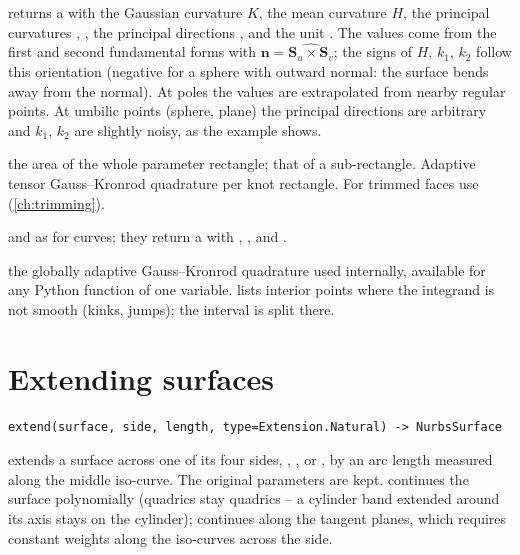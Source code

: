 \begin{description}[style=nextline]
\item[\apiref{surface_curvature}\code{(surface, u, v)}] returns a  with
  the Gaussian curvature  $K$, the mean curvature  $H$, the principal
  curvatures , , the principal directions ,  and the unit
  . The values come from the first and second fundamental forms with $\mathbf n =
  \widehat{\mathbf S_u\times\mathbf S_v}$; the signs of $H$, $k_1$, $k_2$ follow this
  orientation (negative for a sphere with outward normal: the surface bends away from the
  normal). At poles the values are extrapolated from nearby regular points. At umbilic points
  (sphere, plane) the principal directions are arbitrary and $k_1$, $k_2$ are slightly noisy,
  as the example shows.
\item[\apiref{area}\code{(surface, rel_tol=1e-10)}] the area of the whole parameter rectangle;
   that of a sub-rectangle. Adaptive tensor
  Gauss--Kronrod quadrature per knot rectangle. For trimmed faces use
   (\cref{ch:trimming}).
\item[\apiref{closest_point}\code{(surface, point)}] and
   as for curves; they return a
   with , ,  and .
\item[\apiref{integrate}\code{(f, a, b, rel_tol=1e-10, breaks=[], abs_tol=0.0)}] the globally
  adaptive Gauss--Kronrod quadrature used internally, available for any Python function of one
  variable.  lists interior points where the integrand is not smooth (kinks,
  jumps); the interval is split there.
\end{description}

\section{Extending surfaces}\label{sec:surface-extend}

\begin{lstlisting}[style=text]
extend(surface, side, length, type=Extension.Natural) -> NurbsSurface
\end{lstlisting}

 extends a surface across one of its four sides, ,
,  or , by an arc length measured along the middle iso-curve.
The original parameters are kept.  continues the surface polynomially
(quadrics stay quadrics -- a cylinder band extended around its axis stays on the cylinder);
 continues along the tangent planes, which requires constant weights along
the iso-curves across the side.

